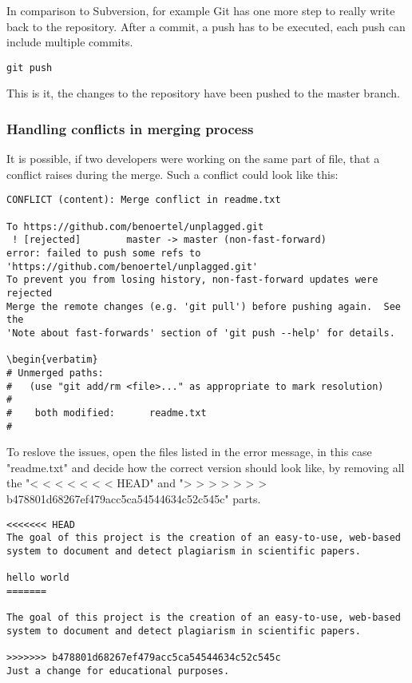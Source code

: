 In comparison to Subversion, for example Git has one more step to really write back to the repository. After a commit, 
a push has to be executed, each push can include multiple commits.

\begin{lstlisting}[caption=Creating branches]
git push
\end{lstlisting}

This is it, the changes to the repository have been pushed to the master branch.

\subsubsection{Handling conflicts in merging process}
It is possible, if two developers were working on the same part of  file, that a conflict raises during the merge. Such 
a conflict could look like this:

\begin{verbatim}
CONFLICT (content): Merge conflict in readme.txt

To https://github.com/benoertel/unplagged.git
 ! [rejected]        master -> master (non-fast-forward)
error: failed to push some refs to 'https://github.com/benoertel/unplagged.git'
To prevent you from losing history, non-fast-forward updates were rejected
Merge the remote changes (e.g. 'git pull') before pushing again.  See the
'Note about fast-forwards' section of 'git push --help' for details.

\begin{verbatim}
# Unmerged paths:
#   (use "git add/rm <file>..." as appropriate to mark resolution)
#
#    both modified:      readme.txt
#
\end{verbatim}

To reslove the issues, open the files listed in the error message, in this case "readme.txt" and decide how the correct 
version should look like, by removing all the "< < < < < < <  HEAD" and "> > > > > > > b478801d68267ef479acc5ca54544634c52c545c" 
parts.

\begin{verbatim}
<<<<<<< HEAD
The goal of this project is the creation of an easy-to-use, web-based
system to document and detect plagiarism in scientific papers.

hello world
=======

The goal of this project is the creation of an easy-to-use, web-based
system to document and detect plagiarism in scientific papers.

>>>>>>> b478801d68267ef479acc5ca54544634c52c545c
Just a change for educational purposes.
\end{verbatim}

